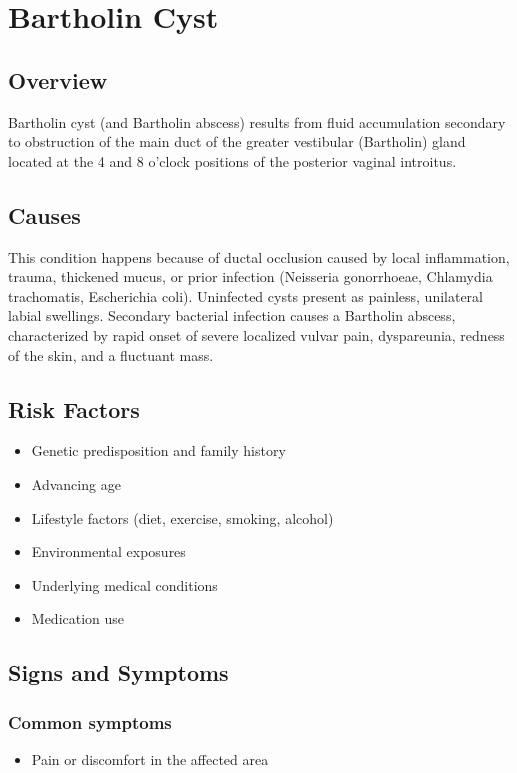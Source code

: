 \chapter{Bartholin Cyst}
\label{sec:Bartholin Cyst}

\section{Overview}
Bartholin cyst (and Bartholin abscess) results from fluid accumulation secondary to obstruction of the main duct of the greater vestibular (Bartholin) gland located at the 4 and 8 o'clock positions of the posterior vaginal introitus.
\section{Causes}
This condition happens because of ductal occlusion caused by local inflammation, trauma, thickened mucus, or prior infection (Neisseria gonorrhoeae, Chlamydia trachomatis, Escherichia coli). Uninfected cysts present as painless, unilateral labial swellings. Secondary bacterial infection causes a Bartholin abscess, characterized by rapid onset of severe localized vulvar pain, dyspareunia, redness of the skin, and a fluctuant mass.     
\section{Risk Factors}

\begin{itemize}[noitemsep]
  \item Genetic predisposition and family history
  \item Advancing age
  \item Lifestyle factors (diet, exercise, smoking, alcohol)
  \item Environmental exposures
  \item Underlying medical conditions
  \item Medication use
\end{itemize}
\section{Signs and Symptoms}

\subsection{Common symptoms}
\begin{itemize}[noitemsep]
  \item Pain or discomfort in the affected area
  \end{itemize}

